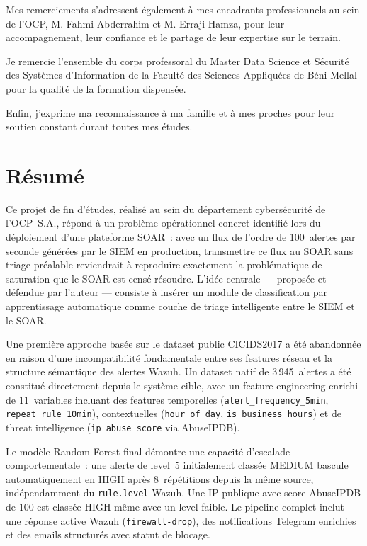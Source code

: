 \documentclass[12pt,a4paper]{report}
\begin{document}
Mes remerciements s'adressent également à mes encadrants
professionnels au sein de l'OCP, M. Fahmi Abderrahim et
M. Erraji Hamza, pour leur accompagnement, leur confiance
et le partage de leur expertise sur le terrain.

Je remercie l'ensemble du corps professoral du Master
Data Science et Sécurité des Systèmes d'Information de la
Faculté des Sciences Appliquées de Béni Mellal pour la
qualité de la formation dispensée.

Enfin, j'exprime ma reconnaissance à ma famille et à mes
proches pour leur soutien constant durant toutes mes études.

\newpage
\chapter*{Résumé}

Ce projet de fin d'études, réalisé au sein du département cybersécurité de l'OCP~S.A., répond à un problème opérationnel concret identifié lors du déploiement d'une plateforme SOAR~: avec un flux de l'ordre de 100~alertes par seconde générées par le SIEM en production, transmettre ce flux au SOAR sans triage préalable reviendrait à reproduire exactement la problématique de saturation que le SOAR est censé résoudre. L'idée centrale — proposée et défendue par l'auteur — consiste à insérer un module de classification par apprentissage automatique comme couche de triage intelligente entre le SIEM et le SOAR.

Une première approche basée sur le dataset public CICIDS2017 a été abandonnée en raison d'une incompatibilité fondamentale entre ses features réseau et la structure sémantique des alertes Wazuh. Un dataset natif de 3\,945~alertes a été constitué directement depuis le système cible, avec un feature engineering enrichi de 11~variables incluant des features temporelles (\texttt{alert\_frequency\_5min}, \texttt{repeat\_rule\_10min}), contextuelles (\texttt{hour\_of\_day}, \texttt{is\_business\_hours}) et de threat intelligence (\texttt{ip\_abuse\_score} via AbuseIPDB).

Le modèle Random Forest final démontre une capacité d'escalade comportementale~: une alerte de level~5 initialement classée MEDIUM bascule automatiquement en HIGH après 8~répétitions depuis la même source, indépendamment du \texttt{rule.level} Wazuh. Une IP publique avec score AbuseIPDB de 100 est classée HIGH même avec un level faible. Le pipeline complet inclut une réponse active Wazuh (\texttt{firewall-drop}), des notifications Telegram enrichies et des emails structurés avec statut de blocage.
\end{document}
